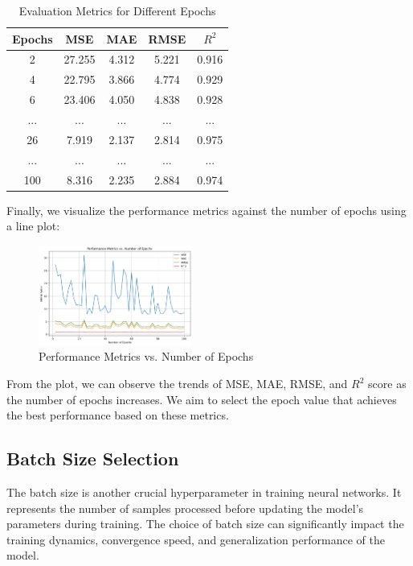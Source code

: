 \documentclass[10pt,twocolumn,letterpaper]{article}
\begin{document}
\begin{table}[H]
    \centering
    \begin{tabular}{ccccc}
        \toprule
        \textbf{Epochs} & \textbf{MSE} & \textbf{MAE} & \textbf{RMSE} & \textbf{$R^2$}\\
        \midrule
        2 & 27.255 & 4.312 & 5.221 & 0.916\\
        4 & 22.795 & 3.866 & 4.774 & 0.929\\
        6 & 23.406 & 4.050 & 4.838 & 0.928\\
        ... & ... & ... & ... & ...\\
        26 & 7.919 & 2.137 & 2.814 & 0.975\\
        ... & ... & ... & ... & ...\\
        100 & 8.316 & 2.235 & 2.884 & 0.974\\
        \bottomrule
    \end{tabular}
    \caption{Evaluation Metrics for Different Epochs}
    \label{tab:epoch-metrics}
\end{table}

Finally, we visualize the performance metrics against the number of epochs using a line plot:

\begin{figure}[H]
    \centering
    \includegraphics[width=0.45\textwidth]{epoch_metrics_plot.png}
    \caption{Performance Metrics vs. Number of Epochs}
    \label{fig:epoch-metrics-plot}
\end{figure}

From the plot, we can observe the trends of MSE, MAE, RMSE, and $R^2$ score as the 
number of epochs increases. We aim to select the epoch value that achieves the best 
performance based on these metrics.

\subsection{Batch Size Selection}

The batch size is another crucial hyperparameter in training neural networks. It 
represents the number of samples processed before updating the model's parameters 
during training. The choice of batch size can significantly impact the training dynamics, 
convergence speed, and generalization performance of the model.
\end{document}
